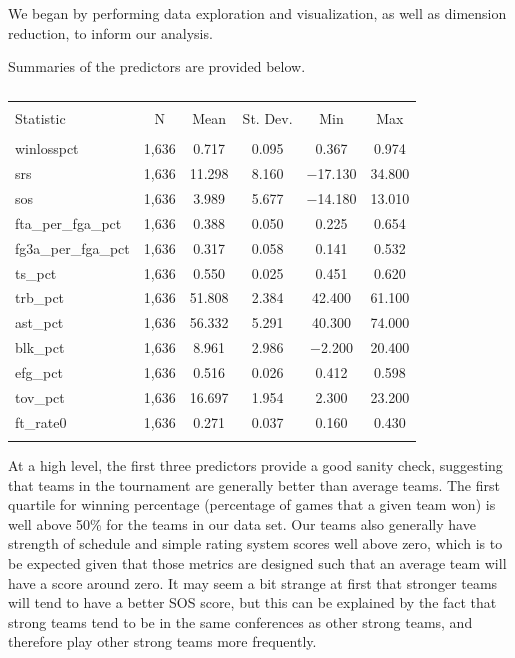\documentclass[10pt,a4paper, hidelinks]{article} %
\begin{document}
We began by performing data exploration and visualization, as well as dimension reduction, to inform our analysis.

Summaries of the predictors are provided below.



\begin{table}[!htbp] \centering 
	\caption{} 
	\label{} 
	\begin{tabular}{@{\extracolsep{5pt}}lccccc} 
		\\[-1.8ex]\hline 
		\hline \\[-1.8ex] 
		Statistic & \multicolumn{1}{c}{N} & \multicolumn{1}{c}{Mean} & \multicolumn{1}{c}{St. Dev.} & \multicolumn{1}{c}{Min} & \multicolumn{1}{c}{Max} \\ 
		\hline \\[-1.8ex] 
		winlosspct & 1,636 & 0.717 & 0.095 & 0.367 & 0.974 \\ 
		srs & 1,636 & 11.298 & 8.160 & $-$17.130 & 34.800 \\ 
		sos & 1,636 & 3.989 & 5.677 & $-$14.180 & 13.010 \\ 
		fta\_per\_fga\_pct & 1,636 & 0.388 & 0.050 & 0.225 & 0.654 \\ 
		fg3a\_per\_fga\_pct & 1,636 & 0.317 & 0.058 & 0.141 & 0.532 \\ 
		ts\_pct & 1,636 & 0.550 & 0.025 & 0.451 & 0.620 \\ 
		trb\_pct & 1,636 & 51.808 & 2.384 & 42.400 & 61.100 \\ 
		ast\_pct & 1,636 & 56.332 & 5.291 & 40.300 & 74.000 \\ 
		blk\_pct & 1,636 & 8.961 & 2.986 & $-$2.200 & 20.400 \\ 
		efg\_pct & 1,636 & 0.516 & 0.026 & 0.412 & 0.598 \\ 
		tov\_pct & 1,636 & 16.697 & 1.954 & 2.300 & 23.200 \\ 
		ft\_rate0 & 1,636 & 0.271 & 0.037 & 0.160 & 0.430 \\ 
		\hline \\[-1.8ex] 
	\end{tabular} 
\end{table} 

At a high level, the first three predictors provide a good sanity check, suggesting that teams in the tournament are generally better than average teams. The first quartile for winning percentage (percentage of games that a given team won) is well above 50\% for the teams in our data set. Our teams also generally have strength of schedule and simple rating system scores well above zero, which is to be expected given that those metrics are designed such that an average team will have a score around zero. It may seem a bit strange at first that stronger teams will tend to have a better SOS score, but this can be explained by the fact that strong teams tend to be in the same conferences as other strong teams, and therefore play other strong teams more frequently.
\end{document}
